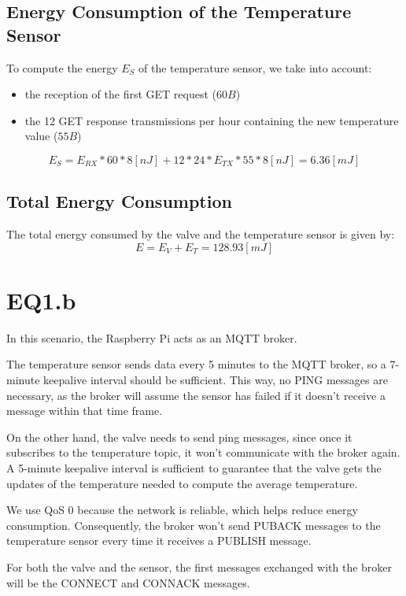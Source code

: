 \documentclass{Configuration_Files/PoliMi3i_thesis}
\begin{document}
\newpage
\subsection{Energy Consumption of the Temperature Sensor}
To compute the energy $E_S$ of the temperature sensor, we take into account:
\begin{itemize}
    \item the reception of the first GET request ($60B$)
    \item the 12 GET response transmissions per hour containing the new temperature value ($55B$)
\end{itemize}
\begin{equation}
    E_S = E_{RX}*60*8  [nJ] + 12*24*E_{TX}*55*8  [nJ] = 6.36 [mJ]
\end{equation}

\subsection{Total Energy Consumption}
The total energy consumed by the valve and the temperature sensor is given by:
\begin{equation}
    E = E_V + E_T = 128.93 [mJ]
\end{equation}

\newpage
\section{EQ1.b}
In this scenario, the Raspberry Pi acts as an MQTT broker.

The temperature sensor sends data every 5 minutes to the MQTT broker, so a 7-minute keepalive interval should be sufficient. This way, no PING messages are necessary, as the broker will assume the sensor has failed if it doesn’t receive a message within that time frame.

On the other hand, the valve needs to send ping messages, since once it subscribes to the temperature topic, it won't communicate with the broker again. A 5-minute keepalive interval is sufficient to guarantee that the valve gets the updates of the temperature needed to compute the average temperature.

We use QoS 0 because the network is reliable, which helps reduce energy consumption. Consequently, the broker won't send PUBACK messages to the temperature sensor every time it receives a PUBLISH message.

For both the valve and the sensor, the first messages exchanged with the broker will be the CONNECT and CONNACK messages.
\end{document}
